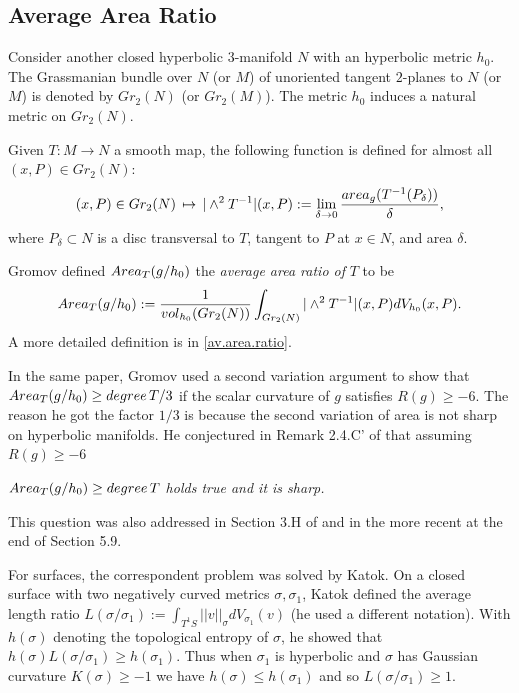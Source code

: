 \documentclass[11pt]{amsart}
\theoremstyle{remark}
\theoremstyle{definition}
\begin{document}
{	\subsection{Average Area Ratio} Consider another closed hyperbolic $3$-manifold  $N$ with an hyperbolic metric $h_0$. The Grassmanian bundle over $N$ (or $M$) of unoriented  tangent $2$-planes  to $N$ (or $M$) is denoted by $Gr_2(N)$ (or  $Gr_2(M)$).  The metric $h_0$ induces a natural metric on $Gr_2(N)$.
	
	
	Given $T:M\rightarrow N$   a smooth map, the following function is defined for almost all $(x,P)\in Gr_2(N)$:
	$$(x,P)\in Gr_2(N)\,\mapsto \,|\wedge^2T^{-1}|(x,P):= \lim_{\delta\to 0}\frac{{\rm area}_g(T^{-1}(P_{\delta}))}{\delta},$$
	where $P_{\delta}\subset N$ is a disc transversal to $T$, tangent to $P$ at $x\in N$, and  area $\delta$.
	
	Gromov  \cite[page 73]{gromov}  defined ${\rm Area}_T(g/h_0)$ the {\em average area ratio of} $T$ to be  
	$${\rm Area}_T(g/h_0):=\frac{1}{{\rm vol}_{h_0}(Gr_2(N))}\int_{Gr_2(N)} |\wedge^2T^{-1}|(x,P) dV_{h_0}(x,P).$$
	A {more detailed}  definition is  in \eqref{av.area.ratio}.
	
	
	
	In the same paper, Gromov used a second variation argument to show that ${\rm Area}_T(g/h_0)\geq {\rm degree}\,T/3$ if the scalar curvature of $g$ satisfies $R(g)\geq -6$. The reason he got the factor $1/3$ is because the second variation of area is not sharp on hyperbolic manifolds. He conjectured in Remark 2.4.C' of \cite{gromov} that  assuming $R(g)\geq -6$
	\begin{center}
		{\em  ${\rm Area}_T(g/h_0)\geq {\rm degree}\,T$ holds true and it is sharp.}
	\end{center}
	This question was also addressed in Section 3.H  of \cite{gromov2} and in the more recent \cite{gromov4} at the end of Section 5.9.
	
	 For surfaces, the correspondent problem was solved by Katok. On a closed surface with two negatively curved metrics $\sigma, \sigma_1$,  Katok \cite{katok} defined the average length ratio $L(\sigma/\sigma_1):=\int_{T^1S}||v||_\sigma dV_{\sigma_1}(v)$ (he used a different notation). With $h(\sigma)$ denoting the topological entropy of $\sigma$,  he showed \cite[Theorem A]{katok} that $h(\sigma)L(\sigma/\sigma_1)\geq h(\sigma_1)$. Thus when $\sigma_1$ is hyperbolic and $\sigma$ has Gaussian curvature $K(\sigma)\geq -1$ we have $h(\sigma)\leq h(\sigma_1)$ and so $L(\sigma/\sigma_1)\geq 1$. 
	
}
\end{document}
